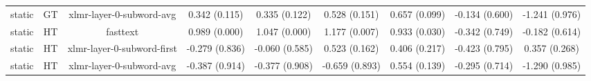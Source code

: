 \begin{sidewaystable}[htb]
\begin{tabular}{@{}ccccccccc@{}}
        static & GT & xlmr-layer-0-subword-avg & 0.342 (0.115) & 0.335 (0.122) & 0.528 (0.151) & 0.657 (0.099) & -0.134 (0.600) & -1.241 (0.976) \\
        static & HT & fasttext & 0.989 (0.000) & 1.047 (0.000) & 1.177 (0.007) & 0.933 (0.030) & -0.342 (0.749) & -0.182 (0.614) \\
        static & HT & xlmr-layer-0-subword-first & -0.279 (0.836) & -0.060 (0.585) & 0.523 (0.162) & 0.406 (0.217) & -0.423 (0.795) & 0.357 (0.268) \\
        static & HT & xlmr-layer-0-subword-avg & -0.387 (0.914) & -0.377 (0.908) & -0.659 (0.893) & 0.554 (0.139) & -0.295 (0.714) & -1.290 (0.985) \\
        \bottomrule
    \end{tabular}
\end{sidewaystable}